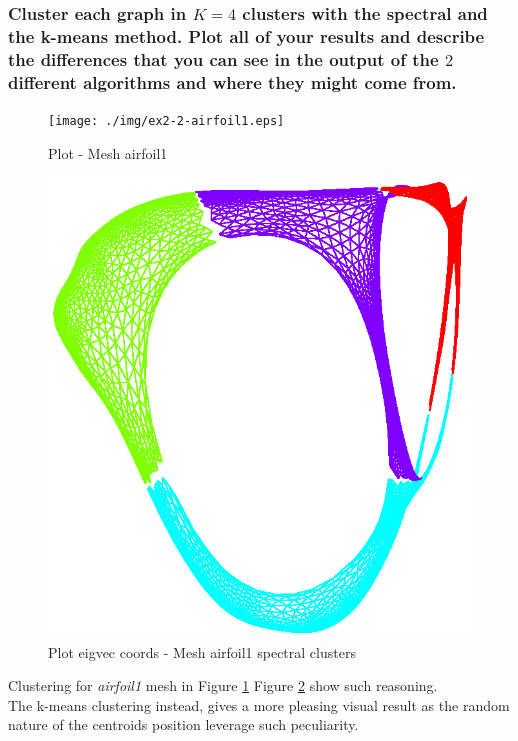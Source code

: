 \documentclass[unicode,11pt,a4paper,oneside,numbers=endperiod,openany]{scrartcl}
\begin{document}
\subsubsection{
    Cluster each graph in $K = 4$ clusters with the spectral and the k-means method.
    Plot all of your results and describe the differences that you can see
    in the output of the $2$ different algorithms and where they might come from.}

\begin{figure}[H]
    \centering
    \caption{Plot - Mesh airfoil1}
    \label{fig:ex2-2-airfoil1}
    \texttt{[image: ./img/ex2-2-airfoil1.eps]}
\end{figure}

\begin{figure}[H]
    \centering
    \caption{Plot eigvec coords - Mesh airfoil1 spectral clusters}
    \label{fig:ex2-2-airfoil1-eigs}
    \includegraphics[width=\textwidth, trim={0cm 0cm 0cm 0.5cm}, clip]{./img/ex2-2-airfoil1-eigs.eps}
\end{figure}

Clustering for \textit{airfoil1} mesh in Figure \ref{fig:ex2-2-airfoil1}
Figure \ref{fig:ex2-2-airfoil1-eigs} show such reasoning.\\
The k-means clustering instead, gives a more pleasing visual result as the random nature of the
centroids position leverage such peculiarity.
\end{document}
